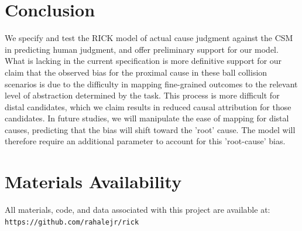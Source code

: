 \documentclass[10pt,letterpaper]{article}
\begin{document}
\section{Conclusion}

We specify and test the RICK model of actual cause judgment against the CSM in predicting human judgment, and offer preliminary support for our model. What is lacking in the current specification is more definitive support for our claim that the observed bias for the proximal cause in these ball collision scenarios is due to the difficulty in mapping fine-grained outcomes to the relevant level of abstraction determined by the task. This process is more difficult for distal candidates, which we claim results in reduced causal attribution for those candidates. In future studies, we will manipulate the ease of mapping for distal causes, predicting that the bias will shift toward the 'root' cause. The model will therefore require an additional parameter to account for this 'root-cause' bias.

\section{Materials Availability}

All materials, code, and data associated with this project are available at: \texttt{https://github.com/rahalejr/rick}

\nocite{*}

\printbibliography
\end{document}
